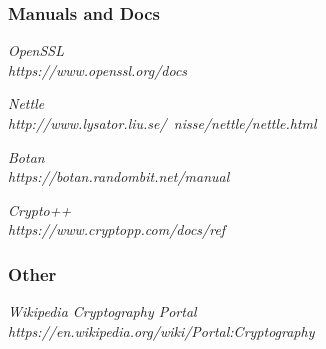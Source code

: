 \documentclass[11 pt]{article}
\begin{document}
\begin{thebibliography}{10}

	\subsubsection*{Manuals and Docs}
	\textsl{OpenSSL} \\
	\textit{https://www.openssl.org/docs}
	
	\textsl{Nettle} \\
	\textit{http://www.lysator.liu.se/~nisse/nettle/nettle.html}
	
	\textsl{Botan} \\
	\textit{https://botan.randombit.net/manual}
	
	\textsl{Crypto++} \\
	\textit{https://www.cryptopp.com/docs/ref}
	
	\subsubsection*{Other}	
	\textsl{Wikipedia Cryptography Portal} \\
	\textit{https://en.wikipedia.org/wiki/Portal:Cryptography}
	
\end{thebibliography}
\end{document}
